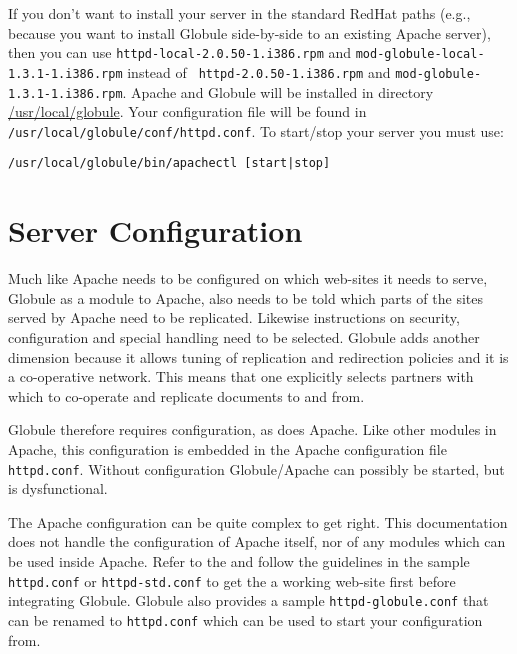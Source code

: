\documentclass[10pt,a4paper]{article}
\makeatletter
\newcommand{\globuleversion}{1.3.1}
\newenvironment{p}{\@open{P}{}}{\@close{P}}
\newenvironment{p}{}{\par}
\newcommand\sectionbr{}
\makeatother
\begin{document}
\begin{p}
If you don't want to install your server in the standard RedHat paths (e.g.,
because you want to install Globule side-by-side to an existing Apache
server), then you can use {\tt httpd-local-2.0.50-1.i386.rpm} and
\texttt{mod-globule-local-\globuleversion-1.i386.rpm} instead of \texttt{
httpd-2.0.50-1.i386.rpm} and
\texttt{mod-globule-\globuleversion-1.i386.rpm}. Apache and Globule will be
installed in directory \url{/usr/local/globule}. Your configuration file will
be found in \texttt{/usr/local/globule/conf/httpd.conf}. To start/stop your
server you must use:
\end{p}

\begin{Verbatim}
/usr/local/globule/bin/apachectl [start|stop]
\end{Verbatim}


\newpage
\section{\label{sec:conf}
  Server Configuration\sectionbr}

\begin{p}
Much like Apache needs to be configured on which web-sites it needs to serve,
Globule as a module to Apache, also needs to be told which parts of the sites
served by Apache need to be replicated.  Likewise instructions on security,
configuration and special handling need to be selected.  Globule adds another
dimension because it allows tuning of replication and redirection policies and
it is a co-operative network.  This means that one explicitly selects partners
with which to co-operate and replicate documents to and from.
\end{p}

\begin{p}
Globule therefore requires configuration, as does Apache.  Like other modules
in Apache, this configuration is embedded in the Apache configuration file
\verb!httpd.conf!.  Without configuration Globule/Apache can possibly be
started, but is dysfunctional.
\end{p}

\begin{p}
The Apache configuration can be quite complex to get right.  This documentation
does not handle the configuration of Apache itself, nor of any modules which
can be used inside Apache.  Refer to the
 and
follow the guidelines in the sample \verb!httpd.conf! or \verb!httpd-std.conf!
to get the a working web-site first before integrating Globule.  Globule also
provides a sample \verb!httpd-globule.conf! that can be renamed to
\verb!httpd.conf! which can be used to start your configuration from.
\end{p}
\end{document}
